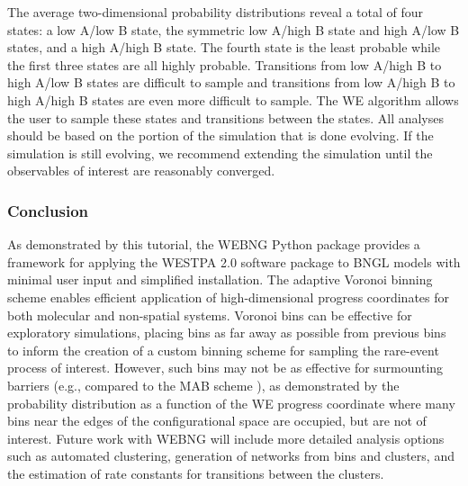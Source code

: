 The average two-dimensional probability distributions reveal a total of four states: a low A/low B state, the symmetric low A/high B state and high A/low B states, and a high A/high B state. 
The fourth state is the least probable while the first three states are all highly probable. 
Transitions from low A/high B to high A/low B states are difficult to sample and transitions from low A/high B to high A/high B states are even more difficult to sample. 
The WE algorithm allows the user to sample these states and transitions between the states. 
All analyses should be based on the portion of the simulation that is done evolving. 
If the simulation is still evolving, we recommend extending the simulation until the observables of interest are reasonably converged. 

\subsubsection{Conclusion}

As demonstrated by this tutorial, the WEBNG Python package provides a framework for applying the WESTPA 2.0 software package to BNGL models with minimal user input and simplified installation. 
The adaptive Voronoi binning scheme enables efficient application of high-dimensional progress coordinates for both molecular and non-spatial systems.
Voronoi bins can be effective for exploratory simulations, placing bins as far away as possible from previous bins to inform the creation of a custom binning scheme for sampling the rare-event process of interest. 
However, such bins may not be as effective for surmounting barriers (e.g., compared to the MAB scheme \citep{torrillo_minimal_2021}), as demonstrated by the probability distribution as a function of the WE progress coordinate where many bins near the edges of the configurational space are occupied, but are not of interest. 
Future work with WEBNG will include more detailed analysis options such as automated clustering, generation of networks from bins and clusters, and the estimation of rate constants for transitions between the clusters. 